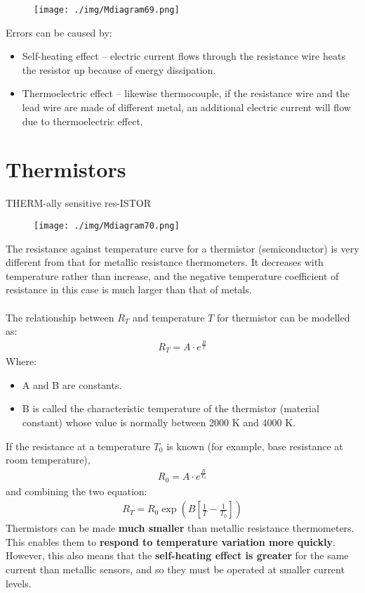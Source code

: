\begin{figure}[H]
  \centering
  \texttt{[image: ./img/Mdiagram69.png]}
\end{figure}
Errors can be caused by:
\begin{itemize}
  \item Self-heating effect – electric current flows through the resistance wire heats the resistor up because of energy dissipation.
  \item Thermoelectric effect – likewise thermocouple, if the resistance wire and the lead wire are made of different metal, an additional electric current will flow due to thermoelectric effect.
\end{itemize}
\section{Thermistors}
THERM-ally sensitive res-ISTOR
\begin{figure}[H]
  \centering
  \texttt{[image: ./img/Mdiagram70.png]}
\end{figure}
The resistance against temperature curve for a thermistor (semiconductor) is very different from that for metallic resistance thermometers. It decreases with temperature rather than increase, and the negative temperature coefficient of resistance in this case is much larger than that of metals. \\\\
The relationship between $R_T$ and temperature $T$ for thermistor can be modelled as:
\begin{gather}
  R_T = A\cdot e^{\frac{B}{T}}
\end{gather}
Where:
\begin{itemize}
  \item A and B are constants.
  \item B is called the characteristic temperature of the thermistor (material constant) whose value is normally between 2000 K and 4000 K.
\end{itemize}
If the resistance at a temperature $T_0$ is known (for example, base resistance at room temperature),
\begin{gather}
  R_0 = A\cdot e^{\frac{B}{T_0}}
\end{gather}
and combining the two equation:
\begin{gather}
  R_T = R_0\exp\left(B\left[\frac{1}{T}-\frac{1}{T_0}\right]\right)
\end{gather}
Thermistors can be made \textbf{much smaller} than metallic resistance thermometers. This enables them to \textbf{respond to temperature variation more quickly}. However, this also means that the \textbf{self-heating effect is greater} for the same current than metallic sensors, and so they must be operated at smaller current levels.
